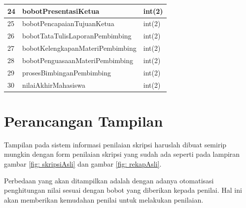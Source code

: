 \begin{tabular}{| m{0.75cm} | m{7cm} | m{3cm} |}
		\hline
		24 & bobotPresentasiKetua & int(2)\\
		\hline
		25 & bobotPencapaianTujuanKetua & int(2)\\
		\hline
		26 & bobotTataTulisLaporanPembimbing & int(2)\\
		\hline
		27 & bobotKelengkapanMateriPembimbing & int(2)\\
		\hline
		28 & bobotPenguasaanMateriPembimbing & int(2)\\
		\hline
		29 & prosesBimbinganPembimbing & int(2)\\
		\hline
		30 & nilaiAkhirMahasiswa & int(2)\\
		\hline
		\end{tabular}
	
	\section{Perancangan Tampilan}
	\label{sec: perancanganTampilan}
	
	Tampilan pada sistem informasi penilaian skripsi haruslah dibuat semirip mungkin dengan form penilaian skripsi yang sudah ada seperti pada lampiran gambar \ref{fig: skripsiAsli} dan gambar \ref{fig: rekapAsli}.
	
	Perbedaan yang akan ditampilkan adalah dengan adanya otomatisasi penghitungan nilai sesuai dengan bobot yang diberikan kepada penilai. Hal ini akan memberikan kemudahan penilai untuk melakukan penilaian.
	
